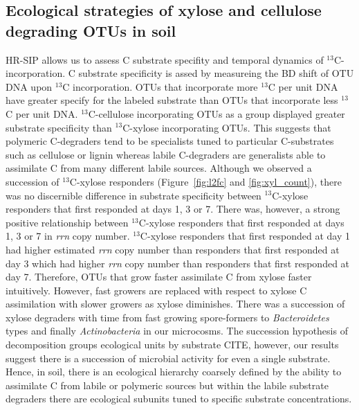 \subsection{Ecological strategies of xylose and cellulose degrading OTUs in soil}
HR-SIP allows us to assess C substrate specifity and temporal dynamics of
$^{13}$C-incorporation. C substrate specificity is assed by measureing the 
BD shift of OTU DNA upon $^{13}$C incorporation. OTUs that incorporate more
$^{13}$C per unit DNA have greater specify for the labeled substrate than
OTUs that incorporate less $^{13}$C per unit DNA. $^{13}$C-cellulose 
incorporating OTUs as a group displayed greater substrate specificity than
$^{13}$C-xylose incorporating OTUs. This suggests that polymeric C-degraders
tend to be specialists tuned to particular C-substrates such as cellulose
or lignin whereas labile C-degraders are generalists able to assimilate
C from many different labile sources. Although we observed a succession of 
$^{13}$C-xylose responders (Figure~\ref{fig:l2fc} and \ref{fig:xyl_count}), 
there was no discernible difference in substrate specificity between 
$^{13}$C-xylose responders that first responded at days 1, 3 or 7. There was,
however, a strong positive relationship between $^{13}$C-xylose responders that
first responded at days 1, 3 or 7 in \textit{rrn} copy number. $^{13}$C-xylose 
responders that first responded at day 1 had higher estimated \textit{rrn} copy 
number than responders that first responded at day 3 which had higher \textit{rrn}
copy number than responders that first responded at day 7. Therefore, OTUs that 
grow faster assimilate C from xylose faster intuitively. However, fast growers
are replaced with respect to xylose C assimilation with slower growers as
xylose diminishes. There was a succession of xylose degraders with time from
fast growing spore-formers to \textit{Bacteroidetes} types and finally 
\textit{Actinobacteria} in our microcosms. The succession hypothesis of
decomposition groups ecological units by substrate CITE, however, our results
suggest there is a succession of microbial activity for even a single
substrate. Hence, in soil, there is an ecological hierarchy coarsely defined by
the ability to assimilate C from labile or polymeric sources but within
the labile substrate degraders there are ecological subunits tuned to specific
substrate concentrations.

